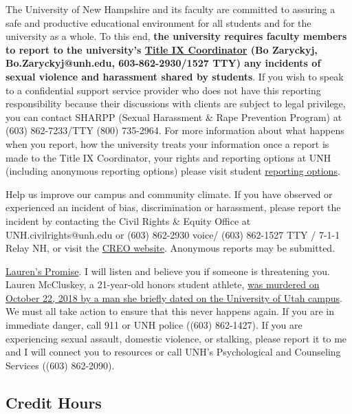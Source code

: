 \documentclass[
  letterpaper,
  DIV=11,
  numbers=noendperiod]{scrreprt}
\begin{document}
The University of New Hampshire and its faculty are committed to
assuring a safe and productive educational environment for all students
and for the university as a whole. To this end, \textbf{the university
requires faculty members to report to the university's
\href{https://www.unh.edu/diversity-inclusion/sexual-misconduct}{Title
IX Coordinator} (Bo Zaryckyj, Bo.Zaryckyj@unh.edu, 603-862-2930/1527
TTY) any incidents of sexual violence and harassment shared by
students}. If you wish to speak to a confidential support service
provider who does not have this reporting responsibility because their
discussions with clients are subject to legal privilege, you can contact
SHARPP (Sexual Harassment \& Rape Prevention Program) at (603)
862-7233/TTY (800) 735-2964. For more information about what happens
when you report, how the university treats your information once a
report is made to the Title IX Coordinator, your rights and reporting
options at UNH (including anonymous reporting options) please visit
student
\href{https://www.unh.edu/diversity-inclusion/sexual-misconduct/reporting-students}{reporting
options}.

Help us improve our campus and community climate. If you have observed
or experienced an incident of bias, discrimination or harassment, please
report the incident by contacting the Civil Rights \& Equity Office at
UNH.civilrights@unh.edu or (603) 862-2930 voice/ (603) 862-1527 TTY /
7-1-1 Relay NH, or visit the
\href{https://www.unh.edu/diversity-inclusion/civil-rights-equity-office}{CREO
website}. Anonymous reports may be submitted.

\href{https://laurenmccluskey.org/laurens-promise/}{Lauren's Promise}. I
will listen and believe you if someone is threatening you. Lauren
McCluskey, a 21-year-old honors student athlete,
\href{https://www.sltrib.com/opinion/commentary/2019/02/10/commentary-failing-lauren/}{was
murdered on October 22, 2018 by a man she briefly dated on the
University of Utah campus}. We must all take action to ensure that this
never happens again. If you are in immediate danger, call 911 or UNH
police ((603) 862-1427). If you are experiencing sexual assault,
domestic violence, or stalking, please report it to me and I will
connect you to resources or call UNH's Psychological and Counseling
Services ((603) 862-2090).

\hypertarget{credit-hours}{%
\subsection*{Credit Hours}\label{credit-hours}}
\end{document}
